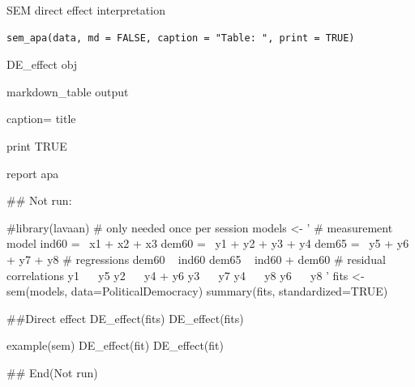 \documentclass[a4paper]{book}
\begin{document}
%
\begin{Description}
SEM direct effect interpretation
\end{Description}
%
\begin{Usage}
\begin{verbatim}
sem_apa(data, md = FALSE, caption = "Table: ", print = TRUE)
\end{verbatim}
\end{Usage}
%
\begin{Arguments}
\begin{ldescription}
\item[\code{data}] DE\_effect obj

\item[\code{md}] markdown\_table output

\item[\code{caption}] caption= title

\item[\code{print}] print TRUE
\end{ldescription}
\end{Arguments}
%
\begin{Value}
report apa
\end{Value}
%
\begin{Examples}
\begin{ExampleCode}

\#\# Not run: 

 #library(lavaan) # only needed once per session
 models <- '
   # measurement model
     ind60 =~ x1 + x2 + x3
     dem60 =~ y1 + y2 + y3 + y4
     dem65 =~ y5 + y6 + y7 + y8
 # regressions
     dem60 ~ ind60
     dem65 ~ ind60 + dem60
   # residual correlations
     y1 ~~ y5
     y2 ~~ y4 + y6
     y3 ~~ y7
     y4 ~~ y8
    y6 ~~ y8
 '
 fits <- sem(models, data=PoliticalDemocracy)
 summary(fits, standardized=TRUE)

 ##Direct effect
 DE_effect(fits)
 DE_effect(fits)%

example(sem)
DE_effect(fit)
DE_effect(fit) %


## End(Not run)

\end{ExampleCode}
\end{Examples}
\end{document}

